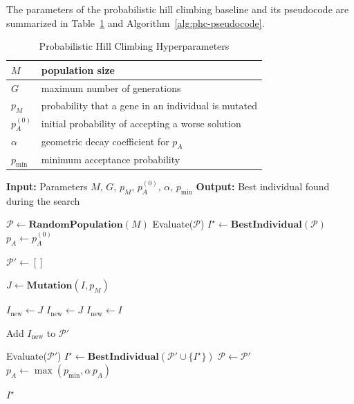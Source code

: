 The parameters of the probabilistic hill climbing baseline and its pseudocode are summarized in Table~\ref{tab:phc-hyperparameters} and Algorithm~\ref{alg:phc-pseudocode}.

\begin{table}[htbp]
\centering
\caption{Probabilistic Hill Climbing Hyperparameters}
\label{tab:phc-hyperparameters}
\begin{tabular}{|l|l|}
\hline
$M$ & population size \\ \hline
$G$ & maximum number of generations \\ \hline
$p_M$ & probability that a gene in an individual is mutated \\ \hline
$p_A^{(0)}$ & initial probability of accepting a worse solution \\ \hline
$\alpha$ & geometric decay coefficient for $p_A$ \\ \hline
$p_{\min}$ & minimum acceptance probability \\ \hline
\end{tabular}
\end{table}


\begin{algorithm}[htbp]
\centering
\begin{minipage}{0.95\linewidth}
\begin{algorithmic}[1]
\State \textbf{Input:} Parameters $M$, $G$, $p_M$, $p_A^{(0)}$, $\alpha$, $p_{\min}$
\State \textbf{Output:} Best individual found during the search

\State $\mathcal{P} \gets \textbf{RandomPopulation}(M)$
\State Evaluate($\mathcal{P}$)
\State $I^\star \gets \textbf{BestIndividual}(\mathcal{P})$
\State $p_A \gets p_A^{(0)}$

    \State $\mathcal{P}' \gets []$ 

        \State $J \gets \textbf{Mutation}(I, p_M)$ 

            \State $I_{\text{new}} \gets J$ 
            \State $I_{\text{new}} \gets J$ 
        \Else
            \State $I_{\text{new}} \gets I$ 
        \EndIf

        \State Add $I_{\text{new}}$ to $\mathcal{P}'$
    \EndFor

    \State Evaluate($\mathcal{P}'$) 
    \State $I^\star \gets \textbf{BestIndividual}(\mathcal{P}' \cup \{I^\star\})$ 
    \State $\mathcal{P} \gets \mathcal{P}'$ 
    \State $p_A \gets \max(p_{\min}, \alpha \, p_A)$ 
\EndFor

\State \Return $I^\star$
\end{algorithmic}
\end{minipage}
\caption{Probabilistic Hill Climbing Pseudocode}
\label{alg:phc-pseudocode}
\end{algorithm}